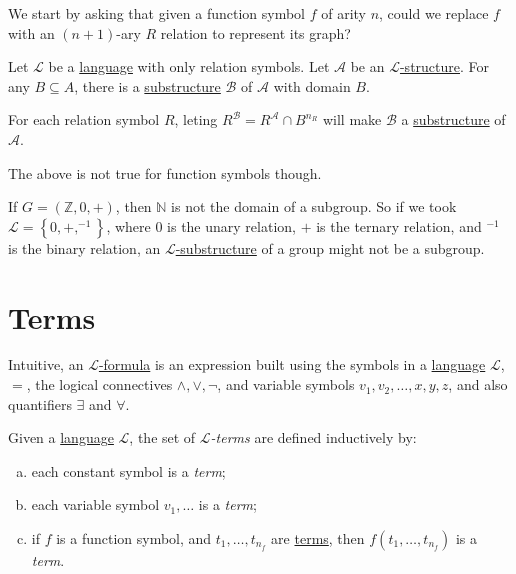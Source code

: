 We start by asking that given a function symbol \(f\) of arity \(n\), could we replace \(f\) with an \((n+1)\)-ary \(R\) relation to represent its graph?

\begin{eg}
	Let \(\mathcal{L} \) be a \hyperref[def:language]{language} with only relation symbols. Let \(\mathcal{A} \) be an \hyperref[def:structure]{\(\mathcal{L} \)-structure}. For any \(B \subseteq A\), there is a \hyperref[def:substructure]{substructure} \(\mathcal{B} \) of \(\mathcal{A} \) with domain \(B\).
\end{eg}
\begin{explanation}
	For each relation symbol \(R\), leting \(R^{\mathcal{B} } =R^{\mathcal{A} }  \cap B^{n_R}\) will make \(\mathcal{B} \) a \hyperref[def:substructure]{substructure} of \(\mathcal{A} \).
\end{explanation}

The above is not true for function symbols though.

\begin{eg}
	If \(G=(\mathbb{Z} , 0, +)\), then \(\mathbb{N} \) is not the domain of a subgroup. So if we took \(\mathcal{L} =\left\{ 0, +, ^{-1}  \right\} \), where \(0\) is the unary relation, \(+\) is the ternary relation, and \(^{-1} \) is the binary relation, an \hyperref[def:substructure]{\(\mathcal{L} \)-substructure} of a group might not be a subgroup.
\end{eg}

\section{Terms}
Intuitive, an \hyperref[def:formula]{\(\mathcal{L} \)-formula} is an expression built using the symbols in a \hyperref[def:language]{language} \(\mathcal{L} \), \(=\), the logical connectives \(\land, \lor, \lnot\), and variable symbols \(v_1, v_2, \dots , x, y, z\), and also quantifiers \(\exists \) and \(\forall \).

\begin{definition}[Term]\label{def:term}
	Given a \hyperref[def:language]{language} \(\mathcal{L} \), the set of \emph{\(\mathcal{L} \)-terms} are defined inductively by:
	\begin{enumerate}[(a)]
		\item each constant symbol is a \emph{term};
		\item each variable symbol \(v_1, \dots \) is a \emph{term};
		\item if \(f\) is a function symbol, and \(t_1, \dots , t_{n_f}\) are \hyperref[def:term]{terms}, then \(f(t_1, \dots , t_{n_f})\) is a \emph{term}.
	\end{enumerate}
\end{definition}

